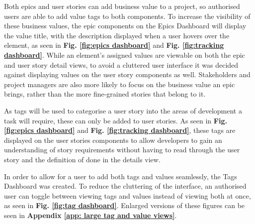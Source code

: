 \documentclass[l4proj.tex]{subfiles}
\begin{document}
Both epics and user stories can add business value to a project, so authorised users are able to add value tags to both components. To increase the visibility of these business values, the epic components on the Epics Dashboard will display the value title, with the description displayed when a user hovers over the element, as seen in \textbf{Fig. \ref{fig:epics dashboard}} and \textbf{Fig. \ref{fig:tracking dashboard}}. While an element's assigned values are viewable on both the epic and user story detail views, to avoid a cluttered user interface it was decided against displaying values on the user story components as well. Stakeholders and project managers are also more likely to focus on the business value an epic brings, rather than the more fine-grained stories that belong to it. 

As tags will be used to categorise a user story into the areas of development a task will require, these can only be added to user stories. As seen in \textbf{Fig. \ref{fig:epics dashboard}} and \textbf{Fig. \ref{fig:tracking dashboard}}, these tags are displayed on the user stories components to allow developers to gain an understanding of story requirements without having to read through the user story and the definition of done in the details view. 

In order to allow for a user to add both tags and values seamlessly, the Tags Dashboard was created. To reduce the cluttering of the interface, an authorised user can toggle between viewing tags and values instead of viewing both at once, as seen in \textbf{Fig. \ref{fig:tag dashboard}}. Enlarged versions of these figures can be seen in \textbf{Appendix \ref{app: large tag and value views}}.
\end{document}
